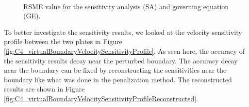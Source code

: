\begin{figure}[H]
    \centering
    \\
    \caption{RSME value for the sensitivity analysis (SA) and governing equation (GE).}
    \label{fig:C4_virtualBoundarySAconvergence}
\end{figure}

To better investigate the sensitivity results, we looked at the velocity sensitivity profile between the two plates in Figure \ref{fig:C4_virtualBoundaryVelocitySensitivityProfile}. As seen here, the accuracy of the sensitivity results decay near the perturbed boundary. The accuracy decay near the boundary can be fixed by reconstructing the sensitivities near the boundary like what was done in the penalization method. The reconstructed results are shown in Figure \ref{fig:C4_virtualBoundaryVelocitySensitivityProfileReconstructed}.

